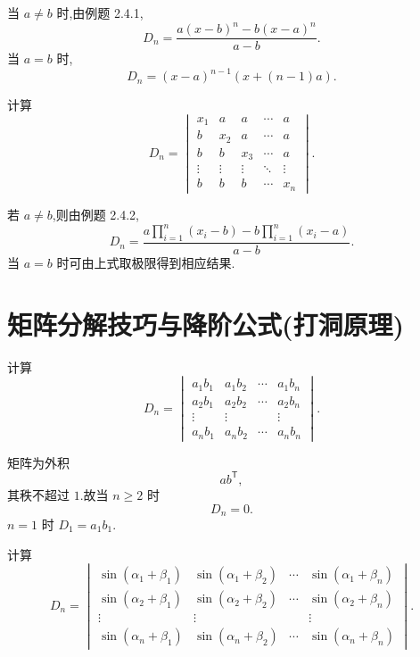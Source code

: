 \begin{solution}
当 $a\neq b$ 时,由例题 2.4.1,
\[
\boxed{
D_n
=
\dfrac{
a(x-b)^n-b(x-a)^n
}{a-b}
}.
\]
当 $a=b$ 时,
\[
\boxed{
D_n=(x-a)^{n-1}\left(x+(n-1)a\right)
}.
\]
\end{solution}


\begin{example}
计算
\[
D_n=
\begin{vmatrix}
x_1&a&a&\cdots&a\\
b&x_2&a&\cdots&a\\
b&b&x_3&\cdots&a\\
\vdots&\vdots&\vdots&\ddots&\vdots\\
b&b&b&\cdots&x_n
\end{vmatrix}.
\]
\end{example}
\exampleblank

\begin{solution}
若 $a\neq b$,则由例题 2.4.2,
\[
\boxed{
D_n
=
\dfrac{
\displaystyle a\prod\limits_{i=1}^{n}(x_i-b)
-
b\prod\limits_{i=1}^{n}(x_i-a)
}{a-b}
}.
\]
当 $a=b$ 时可由上式取极限得到相应结果.
\end{solution}


\newpage

\section{矩阵分解技巧与降阶公式(打洞原理)}

\begin{example}
计算
\[
D_n=
\begin{vmatrix}
a_1b_1&a_1b_2&\cdots&a_1b_n\\
a_2b_1&a_2b_2&\cdots&a_2b_n\\
\vdots&\vdots&&\vdots\\
a_nb_1&a_nb_2&\cdots&a_nb_n
\end{vmatrix}.
\]
\end{example}
\exampleblank

\begin{solution}
矩阵为外积
\[
ab^{\mathsf T},
\]
其秩不超过 $1$.故当 $n\geq2$ 时
\[
\boxed{D_n=0}.
\]
$n=1$ 时 $D_1=a_1b_1$.
\end{solution}


\begin{example}
计算
\[
D_n=
\begin{vmatrix}
\sin(\alpha_1+\beta_1)&\sin(\alpha_1+\beta_2)&\cdots&\sin(\alpha_1+\beta_n)\\
\sin(\alpha_2+\beta_1)&\sin(\alpha_2+\beta_2)&\cdots&\sin(\alpha_2+\beta_n)\\
\vdots&\vdots&&\vdots\\
\sin(\alpha_n+\beta_1)&\sin(\alpha_n+\beta_2)&\cdots&\sin(\alpha_n+\beta_n)
\end{vmatrix}.
\]
\end{example}
\exampleblank

